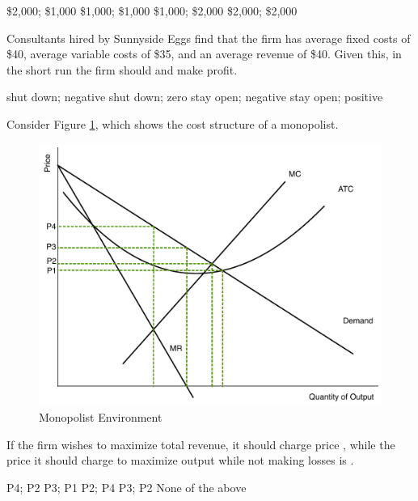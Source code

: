\documentclass[addpoints,11pt]{exam}
\theoremstyle{definition}
\newcommand{\blank}[0]{\underline{\hspace{3cm}}}
\begin{document}
\begin{questions}
	\begin{choices}
		\choice \$2,000; \$1,000
		\choice \$1,000; \$1,000
		\choice \$1,000; \$2,000
		\CorrectChoice \$2,000; \$2,000
	\end{choices}
	
	\question Consultants hired by Sunnyside Eggs find that the firm has average fixed costs of \$40, average variable costs of \$35, and an average revenue of \$40. Given this, in the short run the firm should \blank and make \blank profit.
	
	\begin{choices}
		\choice shut down; negative
		\choice shut down; zero
		\CorrectChoice stay open; negative
		\choice stay open; positive
	\end{choices}
	
	\question Consider Figure \ref{MC35}, which shows the cost structure of a monopolist.
	
	\begin{figure}[H]
		\centering
		\includegraphics[scale=.40]{Final_MC35.pdf}
		\caption{Monopolist Environment}
		\label{MC35}
	\end{figure}
	
	If the firm wishes to maximize total revenue, it should charge price \blank, while the price it should charge to maximize output while not making losses is \blank.
	
	\begin{choices}
		\choice P4; P2
		\CorrectChoice P3; P1
		\choice P2; P4
		\choice P3; P2
		\choice None of the above
	\end{choices}
	


\end{questions}
\end{document}
